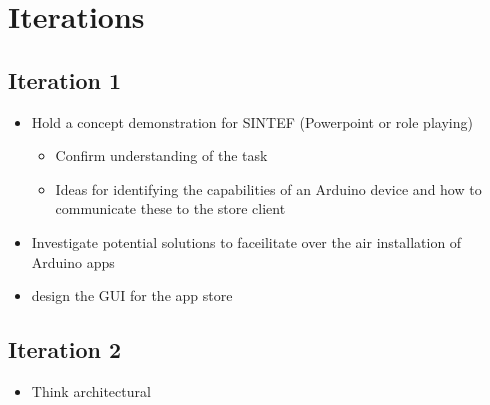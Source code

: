 \section{Iterations}
\subsection{Iteration 1}
\begin{itemize}
	\item{Hold a concept demonstration for SINTEF (Powerpoint or role playing)}
	\begin{itemize}
		\item{Confirm understanding of the task}
		\item{Ideas for identifying the capabilities of an Arduino device and how to communicate these to the store client}
	\end{itemize}
	\item{Investigate potential solutions to faceilitate over the air installation of Arduino apps}
	\item{design the GUI for the app store}
\end{itemize}

\subsection{Iteration 2}
\begin{itemize}
	\item{Think architectural}
\end{itemize}